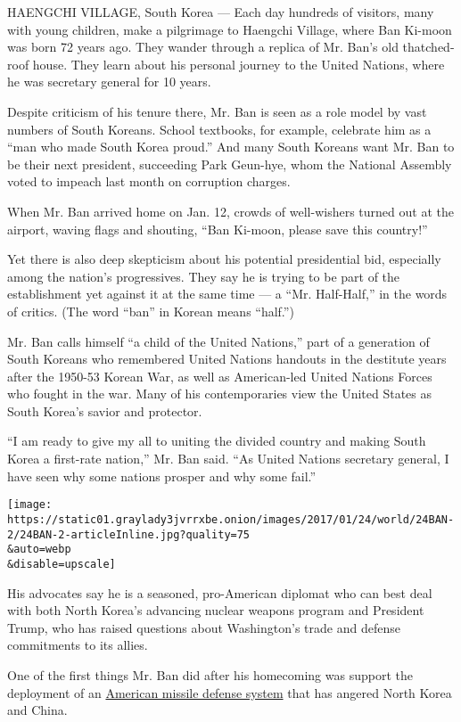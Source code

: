 HAENGCHI VILLAGE, South Korea --- Each day hundreds of visitors, many
with young children, make a pilgrimage to Haengchi Village, where Ban
Ki-moon was born 72 years ago. They wander through a replica of Mr.
Ban's old thatched-roof house. They learn about his personal journey to
the United Nations, where he was secretary general for 10 years.

Despite criticism of his tenure there, Mr. Ban is seen as a role model
by vast numbers of South Koreans. School textbooks, for example,
celebrate him as a ``man who made South Korea proud.'' And many South
Koreans want Mr. Ban to be their next president, succeeding Park
Geun-hye, whom the National Assembly voted to impeach last month on
corruption charges.

When Mr. Ban arrived home on Jan. 12, crowds of well-wishers turned out
at the airport, waving flags and shouting, ``Ban Ki-moon, please save
this country!''

Yet there is also deep skepticism about his potential presidential bid,
especially among the nation's progressives. They say he is trying to be
part of the establishment yet against it at the same time --- a ``Mr.
Half-Half,'' in the words of critics. (The word ``ban'' in Korean means
``half.'')

Mr. Ban calls himself ``a child of the United Nations,'' part of a
generation of South Koreans who remembered United Nations handouts in
the destitute years after the 1950-53 Korean War, as well as
American-led United Nations Forces who fought in the war. Many of his
contemporaries view the United States as South Korea's savior and
protector.

``I am ready to give my all to uniting the divided country and making
South Korea a first-rate nation,'' Mr. Ban said. ``As United Nations
secretary general, I have seen why some nations prosper and why some
fail.''

\texttt{[image: https://static01.graylady3jvrrxbe.onion/images/2017/01/24/world/24BAN-2/24BAN-2-articleInline.jpg?quality=75\\\&auto=webp\\\&disable=upscale]}

His advocates say he is a seasoned, pro-American diplomat who can best
deal with both North Korea's advancing nuclear weapons program and
President Trump, who has raised questions about Washington's trade and
defense commitments to its allies.

One of the first things Mr. Ban did after his homecoming was support the
deployment of an
\href{https://www.nytimes3xbfgragh.onion/2016/07/08/world/asia/south-korea-and-us-agree-to-deploy-missile-defense-system.html}{American
missile defense system} that has angered North Korea and China.

